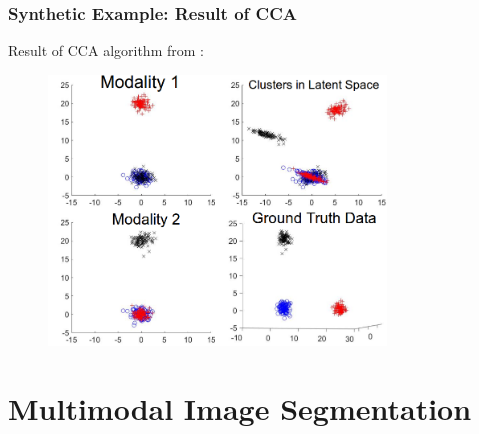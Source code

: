 \documentclass{beamer}
\begin{document}
\begin{frame}
  \frametitle{Synthetic Example: Result of CCA}
  Result of CCA algorithm from \cite{Yeh2014}:
  \begin{figure}[ht]
      \centering
      \includegraphics[width=0.8\textwidth]{./Images/Synthetic/fullImage.png}
    \label{fig:SynthData}
  \end{figure}
\end{frame}


\section{Multimodal Image Segmentation}
\end{document}
